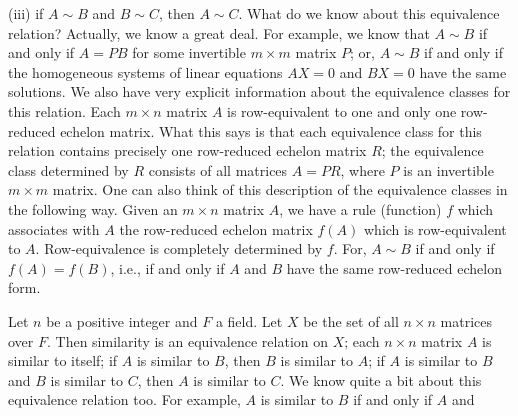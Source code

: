 (iii) if \(A\sim B\) and \(B\sim C\), then \(A\sim C\). What do we know about this equivalence relation? Actually, we know a great deal. For example, we know that \(A\sim B\) if and only if \(A=PB\) for some invertible \(m\times m\) matrix \(P\); or, \(A\sim B\) if and only if the homogeneous systems of linear equations \(AX=0\) and \(BX=0\) have the same solutions. We also have very explicit information about the equivalence classes for this relation. Each \(m\times n\) matrix \(A\) is row-equivalent to one and only one row-reduced echelon matrix. What this says is that each equivalence class for this relation contains precisely one row-reduced echelon matrix \(R\); the equivalence class determined by \(R\) consists of all matrices \(A=PR\), where \(P\) is an invertible \(m\times m\) matrix. One can also think of this description of the equivalence classes in the following way. Given an \(m\times n\) matrix \(A\), we have a rule (function) \(f\) which associates with \(A\) the row-reduced echelon matrix \(f(A)\) which is row-equivalent to \(A\). Row-equivalence is completely determined by \(f\). For, \(A\sim B\) if and only if \(f(A)=f(B)\), i.e., if and only if \(A\) and \(B\) have the same row-reduced echelon form.

Let \(n\) be a positive integer and \(F\) a field. Let \(X\) be the set of all \(n\times n\) matrices over \(F\). Then similarity is an equivalence relation on \(X\); each \(n\times n\) matrix \(A\) is similar to itself; if \(A\) is similar to \(B\), then \(B\) is similar to \(A\); if \(A\) is similar to \(B\) and \(B\) is similar to \(C\), then \(A\) is similar to \(C\). We know quite a bit about this equivalence relation too. For example, \(A\) is similar to \(B\) if and only if \(A\) and 